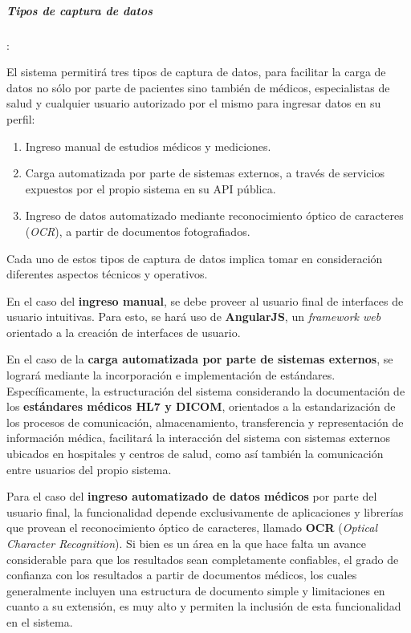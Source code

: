     
\subparagraph{Tipos de captura de datos}:
    
    El sistema permitirá tres tipos de captura de datos, para facilitar la carga de datos no sólo por parte de pacientes sino también de médicos, especialistas de salud y cualquier usuario autorizado por el mismo para ingresar datos en su perfil:
    
    \begin{enumerate}
        \item Ingreso manual de estudios médicos y mediciones.
        \item Carga automatizada por parte de sistemas externos, a través de servicios expuestos por el propio sistema en su API pública.
        \item Ingreso de datos automatizado mediante reconocimiento óptico de caracteres (\textit{OCR}), a partir de documentos fotografiados. 
    \end{enumerate}
    
    Cada uno de estos tipos de captura de datos implica tomar en consideración diferentes aspectos técnicos y operativos.
    
    En el caso del \textbf{ingreso manual}, se debe proveer al usuario final de interfaces de usuario intuitivas.
    Para esto, se hará uso de \textbf{AngularJS}, un \textit{framework web} orientado a la creación de interfaces de usuario.

    En el caso de la \textbf{carga automatizada por parte de sistemas externos}, se logrará mediante la incorporación e implementación de estándares.
    Específicamente, la estructuración del sistema considerando la documentación de los \textbf{estándares médicos HL7 y DICOM}, orientados a la estandarización de los procesos de comunicación, almacenamiento, transferencia y representación de información médica, facilitará la interacción del sistema con sistemas externos ubicados en hospitales y centros de salud, como así también la comunicación entre usuarios del propio sistema.
    
    Para el caso del \textbf{ingreso automatizado de datos médicos} por parte del usuario final, la funcionalidad depende exclusivamente de aplicaciones y librerías que provean el reconocimiento óptico de caracteres, llamado \textbf{OCR} (\textit{Optical Character Recognition}).
    Si bien es un área en la que hace falta un avance considerable para que los resultados sean completamente confiables, el grado de confianza con los resultados a partir de documentos médicos, los cuales generalmente incluyen una estructura de documento simple y limitaciones en cuanto a su extensión, es muy alto y permiten la inclusión de esta funcionalidad en el sistema.
    

